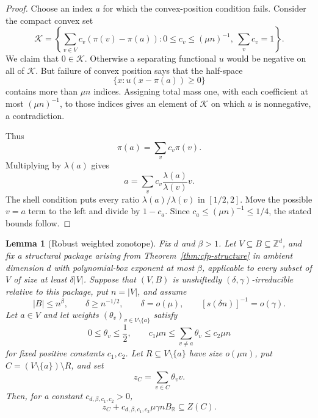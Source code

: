 \documentclass[11pt,reqno]{amsart}
\newtheorem{lemma}[theorem]{Lemma}
\theoremstyle{definition}
\theoremstyle{remark}
\newcommand{\Z}{\mathbb Z}
\newcommand{\R}{\mathbb R}
\begin{document}
\begin{proof}
Choose an index $a$ for which the convex-position condition fails.  Consider the compact convex set
\[
 \mathcal K=\left\{
 \sum_{v\in V}c_v(\pi(v)-\pi(a)):
 0\le c_v\le(\mu n)^{-1},\ \sum_vc_v=1
 \right\}.
\]
We claim that $0\in\mathcal K$.  Otherwise a separating functional $u$ would be negative on all of $\mathcal K$.  But failure of convex position says that the half-space
\[
 \{x:u(x-\pi(a))\ge0\}
\]
contains more than $\mu n$ indices.  Assigning total mass one, with each coefficient at most $(\mu n)^{-1}$, to those indices gives an element of $\mathcal K$ on which $u$ is nonnegative, a contradiction.

Thus
\[
 \pi(a)=\sum_vc_v\pi(v).
\]
Multiplying by $\lambda(a)$ gives
\[
 a=\sum_v c_v\frac{\lambda(a)}{\lambda(v)}v.
\]
The shell condition puts every ratio $\lambda(a)/\lambda(v)$ in $[1/2,2]$.  Move the possible $v=a$ term to the left and divide by $1-c_a$.  Since $c_a\le(\mu n)^{-1}\le1/4$, the stated bounds follow.
\end{proof}

\begin{lemma}[Robust weighted zonotope]
\label{lem:robust-zonotope}
Fix $d$ and $\beta>1$.  Let $V\subseteq B\subseteq\Z^d$, and fix a
structural package arising from Theorem~\ref{thm:cfp-structure} in ambient
dimension $d$ with polynomial-box exponent at most $\beta$, applicable to
every subset of $V$ of size at least $\delta|V|$.  Suppose that $(V,B)$ is
unshiftedly $(\delta,\gamma)$-irreducible relative to this package, put
$n=|V|$, and assume
\[
 |B|\le n^\beta,
 \qquad
 \delta\ge n^{-1/2},
 \qquad
 \delta=o(\mu),
 \qquad
 [s(\delta n)]^{-1}=o(\gamma).
\]
Let $a\in V$ and let weights $(\theta_v)_{v\in V\setminus\{a\}}$
satisfy
\[
 0\le\theta_v\le\frac12,
 \qquad
 c_1\mu n\le\sum_{v\ne a}\theta_v\le c_2\mu n
\]
for fixed positive constants $c_1,c_2$.  Let
$R\subseteq V\setminus\{a\}$ have size $o(\mu n)$, put
$C=(V\setminus\{a\})\setminus R$, and set
\[
 z_C=\sum_{v\in C}\theta_vv.
\]
Then, for a constant $c_{d,\beta,c_1,c_2}>0$,
\[
 z_C+c_{d,\beta,c_1,c_2}\mu\gamma nB_{\R}\subseteq Z(C).
\]
\end{lemma}
\end{document}
